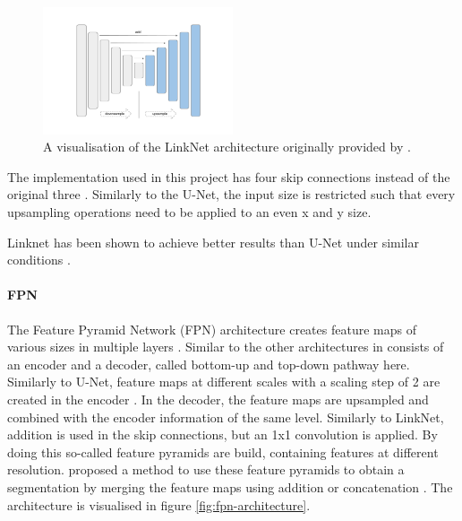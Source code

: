 \begin{figure}[htb!]
	\centering
	\includegraphics[width=0.5\textwidth]{fig/linknet-architecture.png}
	\caption{A visualisation of the LinkNet architecture originally provided by \citeauthor{SegmentationModels} \cite{SegmentationModels}.}
	\label{fig:linknet-architecture}
\end{figure}



The implementation used in this project has four skip connections instead of the original three \cite{SegmentationModels}. Similarly to the U-Net, the input size is restricted such that every upsampling operations need to be applied to an even x and y size.

Linknet has been shown to achieve better results than U-Net under similar conditions \cite{Gao2022}.

\paragraph{FPN}

The Feature Pyramid Network (FPN) architecture creates feature maps of various sizes in multiple layers \cite{Norelyaqine2023}. Similar to the other architectures in consists of an encoder and a decoder, called bottom-up and top-down pathway here\cite{fpn}. Similarly to U-Net, feature maps at different scales with a scaling step of 2 are created in the encoder \cite{fpn}. In the decoder, the feature maps are upsampled and combined with the encoder information of the same level. Similarly to LinkNet, addition is used in the skip connections, but an 1x1 convolution is applied. By doing this so-called feature pyramids are build, containing features at different resolution. \citeauthor{kirillov2019panoptic} proposed a method to use these feature pyramids to obtain a segmentation by merging the feature maps using addition or concatenation \cite{kirillov2019panoptic, SegmentationModels}. The architecture is visualised in figure \ref{fig:fpn-architecture}.

